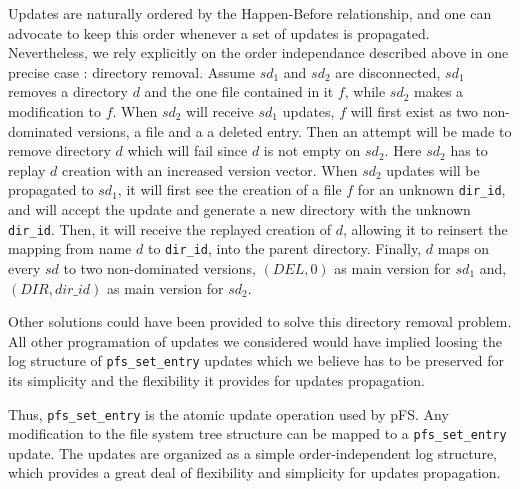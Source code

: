 Updates are naturally ordered by the Happen-Before relationship, and
one can advocate to keep this order whenever a set of updates is
propagated. Nevertheless, we rely explicitly on the order independance
described above in one precise case : directory removal. Assume
$sd_{1}$ and $sd_{2}$ are disconnected, $sd_{1}$ removes a
directory $d$ and the one file contained in it $f$, while $sd_{2}$
makes a modification to $f$. When $sd_{2}$ will receive $sd_{1}$
updates, $f$ will first exist as two non-dominated versions, a file
and a a deleted entry. Then an attempt will be made to remove
directory $d$ which will fail since $d$ is not empty on $sd_{2}$. Here
$sd_{2}$ has to replay $d$ creation with an increased version
vector. When $sd_{2}$ updates will be propagated to $sd_{1}$, it will
first see the creation of a file $f$ for an unknown {\tt dir\_id}, and
will accept the update and generate a new directory with the unknown
{\tt dir\_id}. Then, it will receive the replayed creation of $d$,
allowing it to reinsert the mapping from name $d$ to {\tt dir\_id}, into
the parent directory. Finally, $d$ maps on every $sd$ to two non-dominated
versions, $(DEL,0)$ as main version for $sd_{1}$ and, $(DIR, dir\_id)$ as main version
for $sd_{2}$.


Other solutions could have been provided to solve this directory
removal problem. All other programation of updates we considered would
have implied loosing the log structure of {\tt pfs\_set\_entry}
updates which we believe has to be preserved for its simplicity and
the flexibility it provides for updates propagation.

Thus, {\tt pfs\_set\_entry} is the atomic update operation used by
pFS. Any modification to the file system tree structure can be mapped
to a {\tt pfs\_set\_entry} update. The updates are organized as a
simple order-independent log structure, which provides a great deal of
flexibility and simplicity for updates propagation.

